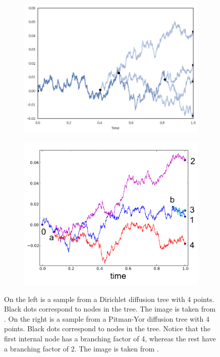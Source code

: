 \documentclass{article}
\begin{document}
\begin{figure}[H]
    \centering
    \begin{subfigure}[b]{0.45\textwidth}
        \centering
        \includegraphics[width=\textwidth]{img/ddt}
    \end{subfigure}
    \hfill
    \begin{subfigure}[b]{0.45\textwidth}
        \centering
        \includegraphics[width=\textwidth]{img/pydt}
    \end{subfigure}
    \caption{
      On the left is a sample from a Dirichlet diffusion tree with 4 points.
      Black dots correspond to nodes in the tree. The image is taken from \citep{Vikram2016}.
      On the right is a sample from a Pitman-Yor diffusion tree with 4 points.
      Black dots correspond to nodes in the tree. Notice
      that the first internal node has a branching factor of 4,
      whereas the rest have a branching factor of 2.
      The image is taken from \citep{Knowles2015}.
    }
    \label{fig:ddt-vis}
\end{figure}
\end{document}
